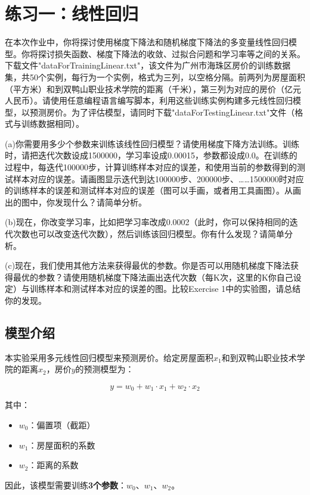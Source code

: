 \documentclass[a4paper]{article}
\begin{document}
\section{练习一：线性回归}
\begin{flushleft}
在本次作业中，你将探讨使用梯度下降法和随机梯度下降法的多变量线性回归模型。你将探讨损失函数、梯度下降法的收敛、过拟合问题和学习率等之间的关系。
下载文件"dataForTrainingLinear.txt"，该文件为广州市海珠区房价的训练数据集，共50个实例，每行为一个实例，格式为三列，以空格分隔。前两列为房屋面积（平方米）和到双鸭山职业技术学院的距离（千米），第三列为对应的房价（亿元人民币）。请使用任意编程语言编写脚本，利用这些训练实例构建多元线性回归模型，以预测房价。为了评估模型，请同时下载"dataForTestingLinear.txt"文件（格式与训练数据相同）。

(a)你需要用多少个参数来训练该线性回归模型？请使用梯度下降方法训练。训练时，请把迭代次数设成1500000，学习率设成0.00015，参数都设成0.0。在训练的过程中，每迭代100000步，计算训练样本对应的误差，和使用当前的参数得到的测试样本对应的误差。请画图显示迭代到达100000步、200000步、……1500000时对应的训练样本的误差和测试样本对应的误差（图可以手画，或者用工具画图）。从画出的图中，你发现什么？请简单分析。

(b)现在，你改变学习率，比如把学习率改成0.0002（此时，你可以保持相同的迭代次数也可以改变迭代次数），然后训练该回归模型。你有什么发现？请简单分析。

(c)现在，我们使用其他方法来获得最优的参数。你是否可以用随机梯度下降法获得最优的参数？请使用随机梯度下降法画出迭代次数（每K次，这里的K你自己设定）与训练样本和测试样本对应的误差的图。比较Exercise 1中的实验图，请总结你的发现。

\end{flushleft}

\subsection{模型介绍}
本实验采用多元线性回归模型来预测房价。给定房屋面积$x_1$和到双鸭山职业技术学院的距离$x_2$，房价$y$的预测模型为：

$$y = w_0 + w_1 \cdot x_1 + w_2 \cdot x_2$$

其中：
\begin{itemize}
    \item $w_0$：偏置项（截距）
    \item $w_1$：房屋面积的系数
    \item $w_2$：距离的系数
\end{itemize}

因此，该模型需要训练\textbf{3个参数}：$w_0$、$w_1$、$w_2$。
\end{document}
